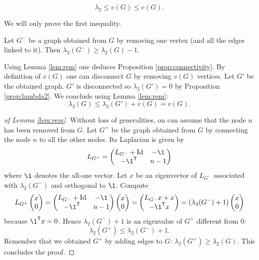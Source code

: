 \documentclass[11pt,nocut]{article}
\begin{document}
\begin{proposition}\label{prop:connectivity}
	$$
	\lambda_2 \leq v(G) \leq e(G).
	$$
\end{proposition}
We will only prove the first inequality.
\begin{lemma}\label{lem:rem}
	Let $G^{-}$ be a graph obtained from $G$ by removing one vertex (and all the edges linked to it). Then $\lambda_2(G^{-}) \geq \lambda_2(G) - 1$.
\end{lemma}
Using Lemma \ref{lem:rem} one deduces Proposition \ref{prop:connectivity}. By definition of $v(G)$ one can disconnect $G$ by removing $v(G)$ vertices. Let $G'$ be the obtained graph. $G'$ is disconnected so $\lambda_2(G') = 0$ by Proposition \ref{prop:lambda2}. We conclude using Lemma \ref{lem:rem}:
$$
\lambda_2(G) \leq \lambda_2(G') + v(G) = v(G).
$$
\begin{proof}[of Lemma \ref{lem:rem}]
	Without loss of generalities, on can assume that the node $n$ has been removed from $G$.
	Let $G^+$ be the graph obtained from $G$ by connecting the node $n$ to all the other nodes. Its Laplacian is given by
	$$
	L_{G^+} =
	\begin{pmatrix}
		L_{G^-} + \Id & -\1 \\
		-\1^{\sT} & n-1
	\end{pmatrix}
	$$
	where $\1$ denotes the all-one vector.
	Let $x$ be an eigenvector of $L_{G^-}$ associated with $\lambda_2(G^{-})$ and orthogonal to $\1$. Compute
	$$
	L_{G^+} 
	\begin{pmatrix}
		x\\
		0
	\end{pmatrix}
	=
	\begin{pmatrix}
		L_{G^-} + \Id & -\1 \\
		-\1^{\sT} & n-1
	\end{pmatrix}
	\begin{pmatrix}
		x\\
		0
	\end{pmatrix}
	=
	\begin{pmatrix}
		L_{G^-} x + x \\
		-\1^{\sT}x 
	\end{pmatrix}
	=
(\lambda_2(G^{-}) + 1)
	\begin{pmatrix}
		 x \\
		0
	\end{pmatrix}
	$$
	because $\1^{\sT}x=0$. Hence $\lambda_2(G^{-}) + 1$ is an eigenvalue of $G^+$ different from $0$:
	$$
	\lambda_2(G^+) \leq \lambda_2(G^{-}) + 1.
	$$
Remember that we obtained $G^+$ by adding edges to $G$: $\lambda_2(G^+) \geq \lambda_2(G)$. This concludes the proof. 
\end{proof}
\end{document}
